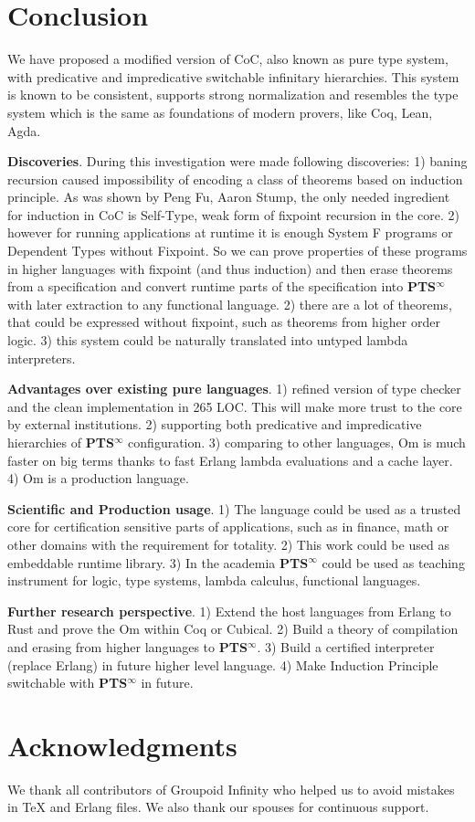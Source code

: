 \documentclass{article}
\begin{document}
\section{Conclusion}
We have proposed a modified version of CoC, also known as pure type system, with predicative and impredicative switchable infinitary hierarchies.
This system is known to be consistent, supports strong normalization and resembles the type system which is the same as foundations of modern provers, like Coq, Lean, Agda.

{\bf Discoveries}.
 During this investigation were made following discoveries:
1) baning recursion caused impossibility of encoding a class of theorems based on induction principle.
As was shown by Peng Fu, Aaron Stump\cite{Fu14}, the only needed ingredient for induction in CoC is Self-Type, weak form of fixpoint recursion in the core.
2) however for running applications at runtime it is enough System F programs or Dependent Types without Fixpoint.
So we can prove properties of these programs in higher languages with fixpoint (and thus induction) and then erase theorems from a specification and convert runtime parts of the specification into {\bf PTS$^\infty$} with later extraction to any functional language.
2) there are a lot of theorems, that could be expressed without fixpoint, such as theorems from higher order logic.
3) this system could be naturally translated into untyped lambda interpreters.

{\bf Advantages over existing pure languages}.
1) refined version of type checker and the clean implementation in 265 LOC.
This will make more trust to the core by external institutions.
2) supporting both predicative and impredicative hierarchies of {\bf PTS$^\infty$} configuration.
3) comparing to other languages, Om is much faster on big terms
thanks to fast Erlang lambda evaluations and a cache layer.
4) Om is a production language.

{\bf Scientific and Production usage}.
1) The language could be used as a trusted core for certification sensitive parts of applications, such as in finance, math or other domains with the requirement for totality.
2) This work could be used as embeddable runtime library.
3) In the academia {\bf PTS$^\infty$} could be used as teaching instrument for logic, type systems, lambda calculus, functional languages.

{\bf Further research perspective}.
1) Extend the host languages from Erlang to Rust and prove the Om within Coq or Cubical.
2) Build a theory of compilation and erasing from higher languages to {\bf PTS$^\infty$}.
3) Build a certified interpreter (replace Erlang) in future higher level language.
4) Make Induction Principle switchable with {\bf PTS$^\infty$} in future.

\section{Acknowledgments}
We thank all contributors of Groupoid Infinity who helped us to avoid mistakes in TeX and Erlang files.
We also thank our spouses for continuous support.



\end{document}
